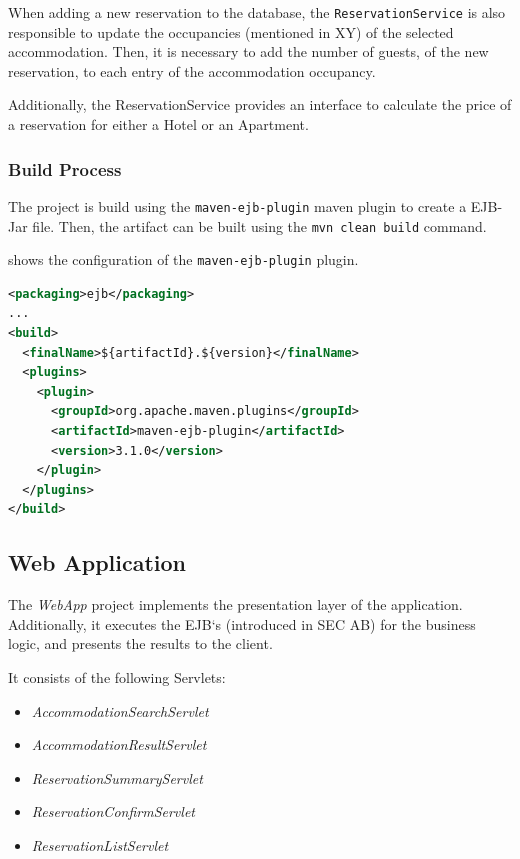 When adding a new reservation to the database, the \texttt{ReservationService} is also responsible to update the occupancies (mentioned in XY) of the selected accommodation. Then, it is necessary to add the number of guests, of the new reservation, to each entry of the accommodation occupancy.

Additionally, the ReservationService provides an interface to calculate the price of a reservation for either a Hotel or an Apartment.


\subsubsection{Build Process}\label{sec:02_impl_beans_build}
The project is build using the \texttt{maven-ejb-plugin} maven plugin to create a EJB-Jar file.
Then, the artifact can be built using the \texttt{mvn clean build} command.

 shows the configuration of the \texttt{maven-ejb-plugin} plugin.
\begin{lstlisting}[label=lst:02_impl_ejb_buildprocess_pluginconfig, caption=\texttt{maven-ejb-plugin} plugin configuration, language=xml]
<packaging>ejb</packaging>
...
<build>
  <finalName>${artifactId}.${version}</finalName>
  <plugins>
    <plugin>
      <groupId>org.apache.maven.plugins</groupId>
      <artifactId>maven-ejb-plugin</artifactId>
      <version>3.1.0</version>
    </plugin>
  </plugins>
</build>
\end{lstlisting}



\subsection{Web Application}\label{sec:02_impl_web}
The \textit{WebApp} project implements the presentation layer of the application. Additionally, it executes the EJB`s (introduced in SEC AB) for the business logic, and presents the results to the client.
 
It consists of the following Servlets:
\begin{itemize}
\item \textit{AccommodationSearchServlet}
\item \textit{AccommodationResultServlet}
\item \textit{ReservationSummaryServlet}
\item \textit{ReservationConfirmServlet}
\item \textit{ReservationListServlet}
\end{itemize}

